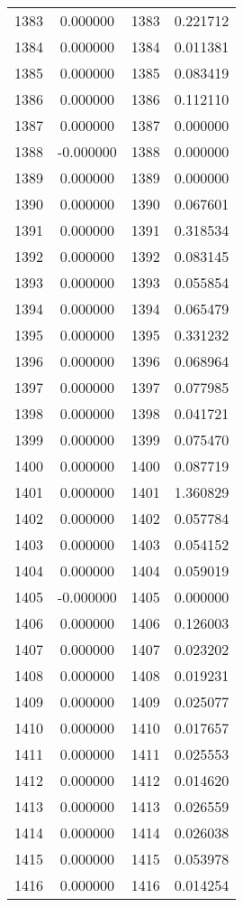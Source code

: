 \documentclass[12pt]{article}
\begin{document}
\begin{longtable}{@{}cccc@{}}
1383 & 0.000000 & 1383 & 0.221712 \\
1384 & 0.000000 & 1384 & 0.011381 \\
1385 & 0.000000 & 1385 & 0.083419 \\
1386 & 0.000000 & 1386 & 0.112110 \\
1387 & 0.000000 & 1387 & 0.000000 \\
1388 & -0.000000 & 1388 & 0.000000 \\
1389 & 0.000000 & 1389 & 0.000000 \\
1390 & 0.000000 & 1390 & 0.067601 \\
1391 & 0.000000 & 1391 & 0.318534 \\
1392 & 0.000000 & 1392 & 0.083145 \\
1393 & 0.000000 & 1393 & 0.055854 \\
1394 & 0.000000 & 1394 & 0.065479 \\
1395 & 0.000000 & 1395 & 0.331232 \\
1396 & 0.000000 & 1396 & 0.068964 \\
1397 & 0.000000 & 1397 & 0.077985 \\
1398 & 0.000000 & 1398 & 0.041721 \\
1399 & 0.000000 & 1399 & 0.075470 \\
1400 & 0.000000 & 1400 & 0.087719 \\
1401 & 0.000000 & 1401 & 1.360829 \\
1402 & 0.000000 & 1402 & 0.057784 \\
1403 & 0.000000 & 1403 & 0.054152 \\
1404 & 0.000000 & 1404 & 0.059019 \\
1405 & -0.000000 & 1405 & 0.000000 \\
1406 & 0.000000 & 1406 & 0.126003 \\
1407 & 0.000000 & 1407 & 0.023202 \\
1408 & 0.000000 & 1408 & 0.019231 \\
1409 & 0.000000 & 1409 & 0.025077 \\
1410 & 0.000000 & 1410 & 0.017657 \\
1411 & 0.000000 & 1411 & 0.025553 \\
1412 & 0.000000 & 1412 & 0.014620 \\
1413 & 0.000000 & 1413 & 0.026559 \\
1414 & 0.000000 & 1414 & 0.026038 \\
1415 & 0.000000 & 1415 & 0.053978 \\
1416 & 0.000000 & 1416 & 0.014254 \\

\end{longtable}
\end{document}
